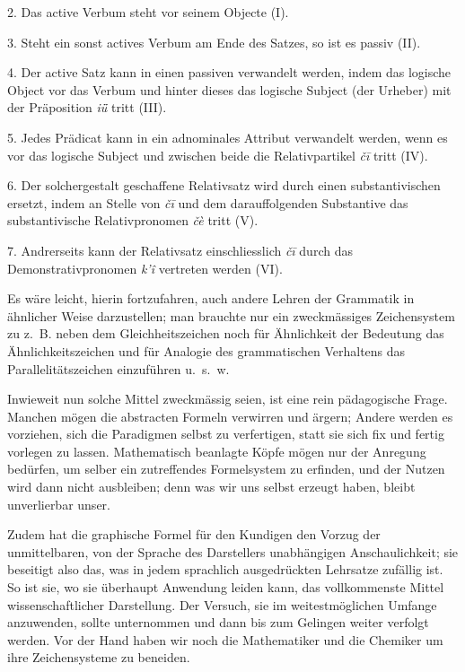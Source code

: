 2. Das active Verbum steht vor seinem Objecte (I).

3. Steht ein sonst actives Verbum am Ende des Satzes, so ist es passiv (II).

4. Der active Satz kann in einen passiven verwandelt werden, indem das logische Object vor das Verbum und hinter dieses das logische Subject (der Urheber) mit der Präposition \textit{iǖ} tritt (III).

5. Jedes Prädicat kann in ein adnominales Attribut verwandelt werden, wenn es vor das logische Subject und zwischen beide die Relativpartikel \textit{čī} tritt (IV).

6. Der solchergestalt geschaffene Relativsatz wird durch einen substantivischen ersetzt, indem an Stelle von \textit{čī} und dem darauffolgenden Substantive das substantivische Relativpronomen \textit{čè} tritt (V).

7. Andrerseits kann der Relativsatz einschliesslich \textit{čī} durch das Demonstrativpronomen \textit{k’î} vertreten werden (VI).

Es wäre leicht, hierin fortzufahren, auch andere Lehren der Grammatik in ähnlicher Weise darzustellen; man brauchte nur ein zweckmässiges Zeichensystem zu  z.~B. neben dem Gleichheitszeichen noch für Ähnlichkeit der Bedeutung das Ähnlichkeitszeichen und für Analogie des grammatischen Verhaltens das Parallelitätszeichen einzuführen u.~s.~w. 

Inwieweit nun solche Mittel zweckmässig seien, ist eine rein pädagogische \label{sp.119} Frage. Manchen mögen die abstracten Formeln verwirren und ärgern; Andere werden es vorziehen, sich die Paradigmen selbst zu verfertigen, statt sie sich fix und fertig vorlegen zu lassen. Mathematisch beanlagte Köpfe mögen nur der Anregung bedürfen, um selber ein zutreffendes Formelsystem zu erfinden, und der Nutzen wird dann nicht ausbleiben; denn was wir uns selbst erzeugt haben, bleibt unverlierbar unser.

Zudem hat die graphische Formel für den Kundigen den Vorzug der unmittelbaren, von der Sprache des Darstellers unabhängigen Anschaulichkeit; sie beseitigt also das, was in jedem sprachlich ausgedrückten Lehrsatze zufällig ist. So ist sie, wo sie überhaupt Anwendung leiden kann, das vollkommenste Mittel wissenschaftlicher Darstellung. Der Versuch, sie im weitestmöglichen Umfange anzuwenden, sollte unternommen und dann bis zum Gelingen weiter verfolgt werden. Vor der Hand haben wir noch die Mathematiker und die Chemiker um ihre Zeichensysteme zu beneiden.


